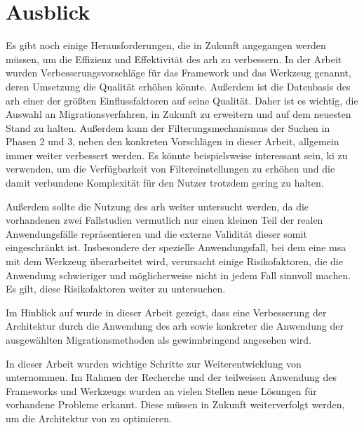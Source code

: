 \section{Ausblick}

Es gibt noch einige Herausforderungen, die in Zukunft angegangen werden müssen, um die Effizienz und Effektivität des \gls{arh} zu verbessern.
In der Arbeit wurden Verbesserungsvorschläge für das Framework und das Werkzeug genannt, deren Umsetzung die Qualität erhöhen könnte.
Außerdem ist die Datenbasis des \gls{arh} einer der größten Einflussfaktoren auf seine Qualität.
Daher ist es wichtig, die Auswahl an Migrationsverfahren, \bpp in Zukunft zu erweitern und auf dem neuesten Stand zu halten.
Außerdem kann der Filterungsmechanismus der Suchen in Phasen 2 und 3, neben den konkreten Vorschlägen in dieser Arbeit, allgemein immer weiter verbessert werden.
Es könnte beispielsweise interessant sein, \gls{ki} zu verwenden, um die Verfügbarkeit von Filtereinstellungen zu erhöhen und die damit verbundene Komplexität für den Nutzer trotzdem gering zu halten.

Außerdem sollte die Nutzung des \gls{arh} weiter untersucht werden, da die vorhandenen zwei Fallstudien vermutlich nur einen kleinen Teil der realen Anwendungsfälle repräsentieren und die externe Validität dieser somit eingeschränkt ist.
Insbesondere der spezielle Anwendungsfall, bei dem eine \gls{msa} mit dem Werkzeug überarbeitet wird, verursacht einige Risikofaktoren, die die Anwendung schwieriger und möglicherweise nicht in jedem Fall sinnvoll machen.
Es gilt, diese Risikofaktoren weiter zu untersuchen.

Im Hinblick auf \jf wurde in dieser Arbeit gezeigt, dass eine Verbesserung der Ar\-chi\-tek\-tur durch die Anwendung des \gls{arh} sowie konkreter die Anwendung der ausgewählten Migrationsmethoden als gewinnbringend angesehen wird.

In dieser Arbeit wurden wichtige Schritte zur Weiterentwicklung von \jf unternommen. 
Im Rahmen der Recherche und der teilweisen Anwendung des Frameworks und Werkzeugs wurden an vielen Stellen neue Lösungen für vorhandene Probleme erkannt. 
Diese müssen in Zukunft weiterverfolgt werden, um die Architektur von \jf zu optimieren.

